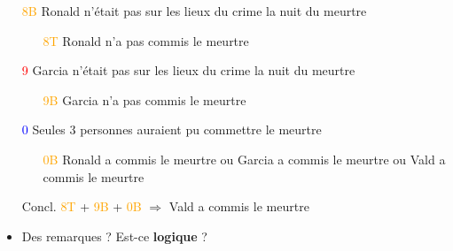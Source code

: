 \begin{frame}

\begin{itemize}

   
     \item[\textcolor{orange}{8B}] Ronald n'était pas sur les lieux du crime la nuit du meurtre\pause
     \begin{itemize}
     \item[\textcolor{orange}{8T}] Ronald n'a pas commis le meurtre\pause
     \end{itemize}
     \item[\textcolor{red}{9}] Garcia n'était pas sur les lieux du crime la nuit du meurtre

     \begin{itemize}
     \item[\textcolor{orange}{9B}] Garcia n'a pas commis le meurtre\pause
     \end{itemize}

     \item[\textcolor{blue}0] Seules 3 personnes auraient pu commettre le meurtre\pause
     
     \begin{itemize}
     \item[\textcolor{orange}{0B}] Ronald a commis le meurtre ou Garcia a commis le meurtre ou Vald a commis le meurtre\pause
     \end{itemize}

     \item[Concl.] \textcolor{orange}{8T} + \textcolor{orange}{9B} + \textcolor{orange}{0B} $\Rightarrow$ Vald a commis le meurtre\pause
     
     \item Des remarques ? \pause Est-ce \textbf{logique} ?

\end{itemize}
\end{frame}





